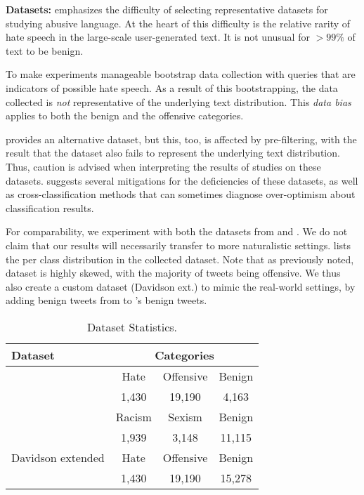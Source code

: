 
\noindent
\textbf{Datasets:}
\citet{wiegand-etal-2019-detection} emphasizes the difficulty of selecting representative datasets for studying abusive language. At the heart of this difficulty is the relative rarity of hate speech in the large-scale user-generated text. It is not unusual for $> 99\%$ of text to be benign.

To make experiments manageable \citet{waseem-hovy-2016}
bootstrap data collection with queries that are indicators of possible hate speech. As a result of this bootstrapping, the data collected is {\em not} representative of the underlying text distribution. This {\em data bias} applies to both the benign and the offensive categories.

\citet{davidson2017automated} provides an alternative dataset, but this, too, is affected by pre-filtering, with the result that the dataset also fails to represent the underlying text distribution. Thus, caution is advised when interpreting the results of studies on these datasets. \citet{wiegand-etal-2019-detection} suggests several mitigations for the deficiencies of these datasets, as well as cross-classification methods that can sometimes diagnose over-optimism about classification results.

For comparability, we experiment with both the datasets from \citet{davidson2017automated} and \citet{waseem-hovy-2016}.
We do not claim that our results will necessarily transfer to more naturalistic settings.  lists the per class distribution in the collected dataset. Note that as previously noted, \citet{davidson2017automated} dataset is highly skewed, with the majority of tweets being offensive. We thus also create a custom dataset (Davidson ext.) to mimic the real-world settings, by adding benign tweets from \citet{waseem-hovy-2016} to \citet{davidson2017automated}'s benign tweets.

\begin{table*}[h]
  \centering
  \small
\begin{tabular}{ l c c  c }
\toprule
 Dataset &  \multicolumn{3}{c}{{Categories}} \\
  \midrule
 \multirow{2}{*}{\citet{davidson2017automated}}& Hate & Offensive & Benign \\ \cline{2-4}
              & 1,430 & 19,190 & 4,163 \\
 \multirow{2}{*}{\citet{waseem-hovy-2016}}& Racism & Sexism & Benign \\ \cline{2-4}
 & 1,939 & 3,148 & 11,115 \\
 Davidson extended   &  Hate & Offensive & Benign \\ \cline{2-4}
 & 1,430 & 19,190 & 15,278 \\
 \bottomrule %
\end{tabular}
\caption{\label{tab:data} Dataset Statistics. }
\end{table*}
